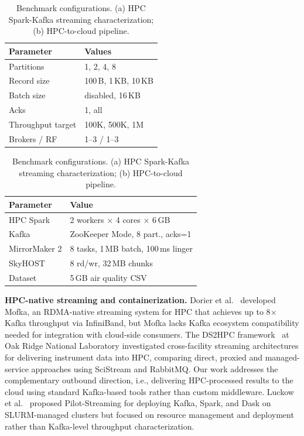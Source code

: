 \documentclass[runningheads]{llncs}
\begin{document}
\begin{table}[t]
\centering
\caption{Benchmark configurations. (a) HPC Spark-Kafka streaming characterization; (b) HPC-to-cloud pipeline.}
\label{tab:configs}
\begin{minipage}[t]{0.46\textwidth}
\centering
\small
{}
\begin{tabular}{@{}lp{2.4cm}@{}}
\toprule
\textbf{Parameter} & \textbf{Values} \\
\midrule
Partitions        & 1, 2, 4, 8 \\
Record size       & 100\,B, 1\,KB, 10\,KB \\
Batch size        & disabled, 16\,KB \\
Acks              & 1, all \\
Throughput target & 100K, 500K, 1M \\
Brokers / RF      & 1--3 / 1--3 \\
\bottomrule
\end{tabular}
\end{minipage}\hfill
\begin{minipage}[t]{0.50\textwidth}
\centering
\small
{}
\begin{tabular}{@{}lp{3.3cm}@{}}
\toprule
\textbf{Parameter} & \textbf{Value} \\
\midrule
HPC Spark   & 2 workers $\times$ 4 cores $\times$ 6\,GB \\
Kafka       & ZooKeeper Mode, 8 part., acks=1 \\
MirrorMaker 2         & 8 tasks, 1\,MB batch, 100\,ms linger \\
SkyHOST     & 8 rd/wr, 32\,MB chunks \\
Dataset     & 5\,GB air quality CSV \\
\bottomrule
\end{tabular}
\end{minipage}
\end{table}


\textbf{HPC-native streaming and containerization.} Dorier et al.~\cite{mofka2023} developed Mofka, an RDMA-native streaming system for HPC that achieves up to 8$\times$ Kafka throughput via InfiniBand, but Mofka lacks Kafka ecosystem compatibility needed for integration with cloud-side consumers. The DS2HPC framework~\cite{ds2hpc2025} at Oak Ridge National Laboratory investigated cross-facility streaming architectures for delivering instrument data into HPC, comparing direct, proxied and managed-service approaches using SciStream and RabbitMQ. Our work addresses the complementary outbound direction, i.e., delivering HPC-processed results to the cloud using standard Kafka-based tools rather than custom middleware. Luckow et al.~\cite{pilotstreaming2018} proposed Pilot-Streaming for deploying Kafka, Spark, and Dask on SLURM-managed clusters but focused on resource management and deployment rather than Kafka-level throughput characterization. 
\end{document}
